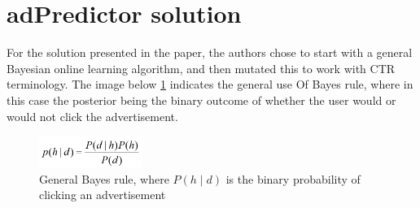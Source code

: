 \documentclass[journal]{IEEEtran}
\begin{document}
\section{adPredictor solution}
For the solution presented in the paper, the authors chose to start with a general Bayesian online learning algorithm, and then mutated this to work with CTR terminology. The image below \ref{fig:bayes} indicates the general use Of Bayes rule, where in this case the posterior being the binary outcome of whether the user would or would not click the advertisement. \\

\begin{figure}[!ht]
  \caption{General Bayes rule, where \(P(h \mid d)\) is the binary probability of clicking an advertisement}
  \centering
  \label{fig:bayes}
    \includegraphics[width=0.3\textwidth]{bayes}
\end{figure}
\end{document}

